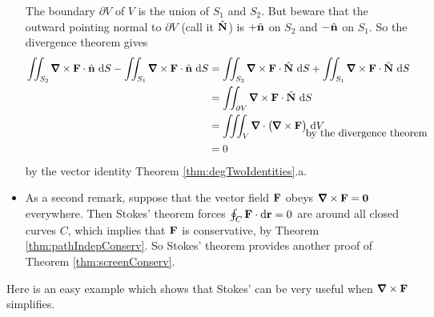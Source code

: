 \begin{itemize}
The boundary $\partial V$ of $V$ is the union of $S_1$ and $S_2$.
But beware that the outward pointing normal to $\partial V$ (call it
$\hat{\mathbf{N}}$) is $+\hat{\mathbf{n}}$ on $S_2$ and $-\hat{\mathbf{n}}$ on $S_1$. So the divergence 
theorem gives
\begin{align*}
\dblInt_{S_2}\vnabla\times\vF\cdot\hn\ \dee{S}
-\dblInt_{S_1}\vnabla\times\vF\cdot\hn\ \dee{S}
&= \dblInt_{S_2}\vnabla\times\vF\cdot\hN\ \dee{S}
+\dblInt_{S_1}\vnabla\times\vF\cdot\hN\ \dee{S} \\
&= \dblInt_{\partial V}\vnabla\times\vF\cdot\hN\ \dee{S} \\
&= \tripInt_{V}\vnabla\cdot\big(\vnabla\times\vF\big)\ \dee{V} \\[-0.2in]
&\hskip1in\qquad\text{by the divergence theorem} \\
&=0
\end{align*}
by the vector identity Theorem \ref{thm:degTwoIdentities}.a.





\item
As a second remark, suppose that the vector field $\mathbf{F}$ obeys $\vnabla\times\vF=\vZero$ everywhere. Then Stokes' theorem forces
$\oint_{C}\mathbf{F}\cdot \mathrm{d}\mathbf{r}=0$ are around all closed curves $C$,
which implies that $\mathbf{F}$ is conservative, by 
Theorem \ref{thm:pathIndepConserv}. So Stokes' theorem provides
another proof of Theorem \ref{thm:screenConserv}.

\end{itemize}

Here is an easy example which shows that Stokes' can be very useful 
when $\vnabla\times\vF$ simplifies.


